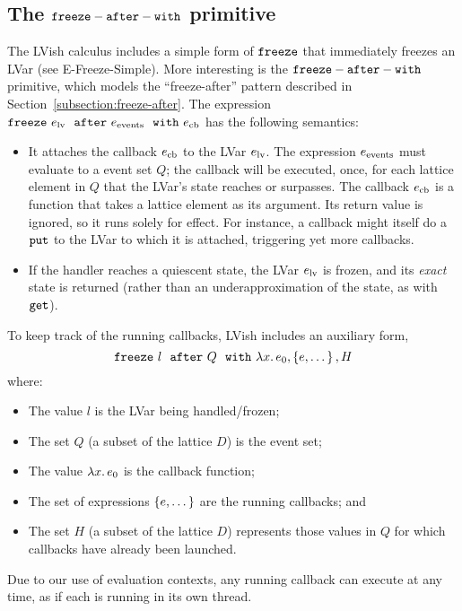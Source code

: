 \subsection{The ${\mbox{\texttt{freeze}}-\mbox{\texttt{after}}-\mbox{\texttt{with}}}$ primitive}\label{subsection:language-freezing}


The LVish calculus includes a simple form of $\mbox{\texttt{freeze}}$ that immediately
freezes an LVar (see {\sc E-Freeze-Simple}).  
More interesting is the ${\mbox{\texttt{freeze}}-\mbox{\texttt{after}}-\mbox{\texttt{with}}}$ primitive, which
models the ``freeze-after'' pattern described in Section~\ref{subsection:freeze-after}.
The expression $\mbox{\texttt{freeze}}~e_{\rm lv}~~{\mbox{\texttt{after}}}~e_{\rm events}~~{\mbox{\texttt{with}}}~e_{\rm cb}$ has the following semantics:
\begin{itemize}
\item It attaches the callback $e_{\rm cb}$ to the LVar $e_{\rm lv}$.  The
  expression $e_{\rm events}$ must evaluate to a event set $Q$; the callback
  will be executed, once, for each lattice element in $Q$ that the LVar's state
  reaches or surpasses.
The callback $e_{\rm cb}$ is a function that
  takes a lattice element as its argument.  Its return value is ignored, so it
  runs solely for effect.  For instance, a callback might itself do a $\mbox{\texttt{put}}$ to
  the LVar to which it is attached, triggering yet more callbacks.
\item If the handler reaches a quiescent state, the LVar $e_{\rm lv}$
  is frozen, and its \emph{exact} state is returned (rather than an
  underapproximation of the state, as with $\mbox{\texttt{get}}$).
\end{itemize}

To keep track of the running callbacks, LVish includes an auxiliary form,{
\[
   \mbox{\texttt{freeze}}~l~~{\mbox{\texttt{after}}}~Q~~{\mbox{\texttt{with}}}~\lambda x.\,e_0, \left\{e, \dots\right\}, H
\]}%
where:
\begin{itemize}
\item The value $l$ is the LVar being handled/frozen;
\item The set $Q$ (a subset of the lattice $D$) is the event set;
\item The value $\lambda x.\,e_0$ is the callback function;
\item The set of expressions $\left\{e, \dots\right\}$ are the running callbacks; and
\item The set $H$ (a subset of the lattice $D$) represents those values in $Q$
  for which callbacks have already been launched.
\end{itemize}
Due to our use of evaluation contexts, any running callback can execute at any
time, as if each is running in its own thread.

